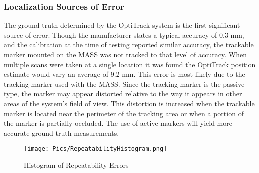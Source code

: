 \subsubsection{Localization Sources of Error}
\label{sec:locsourceerror}

The ground truth determined by the OptiTrack system is the first significant source of error. Though the manufacturer states a typical accuracy of 0.3 mm, and the calibration at the time of testing reported similar accuracy, the trackable marker mounted on the MASS was not tracked to that level of accuracy. When multiple scans were taken at a single location it was found the OptiTrack position estimate would vary an average of 9.2 mm. This error is most likely due to the tracking marker used with the MASS. Since the  tracking marker is the passive type, the marker may appear distorted relative to the way it appears in other areas of the system's field of view. This distortion is increased when the trackable marker is located near the perimeter of the tracking area or when a portion of the marker is partially occluded. The use of active markers will yield more accurate ground truth measurements.\\

\begin{figure}
    \centering
    \texttt{[image: Pics/RepeatabilityHistogram.png]}
    \caption{Histogram of Repeatability Errors}
    \label{fig:repeathist}
\end{figure}

